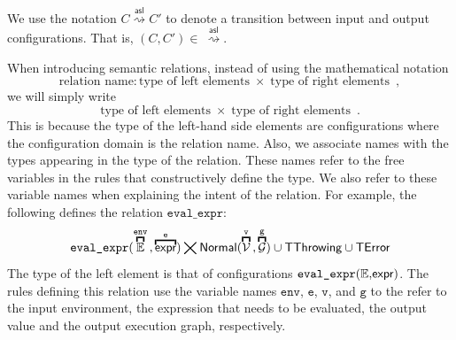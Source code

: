 \documentclass{book}
\newcommand\semantic[1]{\llbracket #1 \rrbracket}
\newcommand\overname[2]{\overbracket{#1}^{#2}}
\newcommand\XGraphs[0]{\mathcal{G}}
\newcommand\vals[0]{\mathcal{V}}
\newcommand\evalarrow[0]{\stackrel{\mathsf{asl}}{\rightsquigarrow}}
\newcommand\aslrel[0]{\bigtimes}
\newcommand\aslsep[0]{\mathbf{,}}
\newcommand\TError[0]{\textsf{TError}}
\newcommand\TThrowing[0]{\textsf{TThrowing}}
\newcommand\TContinuing[0]{\textsf{TContinuing}}
\newcommand\TReturning[0]{\textsf{TReturning}}
\newcommand\TOutConfig[0]{\textsf{TOutConfig}}
\newcommand\evalexpr[1]{\texttt{eval\_expr}(#1)}
\newcommand\evalcatchers[1]{\texttt{eval\_catchers}(#1)}
\newcommand\evalcall[1]{\texttt{eval\_call}(#1)}
\newcommand\evalspec[1]{\texttt{eval\_spec}(#1)}
\newcommand\Normal[0]{\textsf{Normal}}
\newcommand\env[0]{\texttt{env}}
\newcommand\ve[0]{\texttt{e}}
\newcommand\vg[0]{\texttt{g}}
\newcommand\vv[0]{\texttt{v}}
\begin{document}

  We use the notation $C \evalarrow C'$ to denote a transition between input and output configurations.
  That is, $(C, C') \in\ \evalarrow$.

  When introducing semantic relations, instead of using the mathematical notation
  \[
    \text{relation name} : \text{type of left elements} \;\times\; \text{type of right elements} \enspace,
  \]
  we will simply write
  \[
    \text{type of left elements} \;\times\; \text{type of right elements} \enspace.
  \]
  This is because the type of the left-hand side elements are configurations where the
  configuration domain is the relation name.
  Also, we associate names with the types appearing in the type of the relation.
  These names refer to the free variables in the rules that constructively define the type.
  We also refer to these variable names when explaining the intent of the relation.
  For example, the following defines the relation $\texttt{eval\_expr}$:
  \[
    \evalexpr{\overname{\envs}{\env} \aslsep \overname{\expr}{\ve}} \aslrel \Normal(\overname{\vals}{\vv} \aslsep \overname{\XGraphs}{\vg}) \cup \TThrowing \cup \TError
  \]
  The type of the left element is that of configurations $\evalexpr{\envs \aslsep \expr}$.
  The rules defining this relation use the variable names
  $\env$, $\ve$, $\vv$, and $\vg$ to the refer to the input environment, the expression that needs to be evaluated,
  the output value and the output execution graph, respectively.
\end{document}
